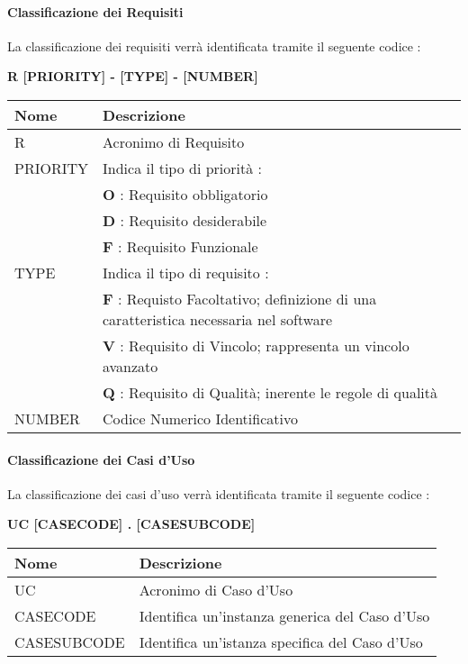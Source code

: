     \paragraph{Classificazione dei Requisiti} \hfill \break
    La classificazione dei requisiti verrà identificata tramite il seguente codice : 
    \begin{center}
      \textbf{R [PRIORITY] - [TYPE] - [NUMBER]}
    \end{center}

    \renewcommand{\arraystretch}{1.8} %
    \begin{tabular}{ |m{7em}|m{30em}| }
      \hline
      \textbf{Nome} & \textbf{Descrizione} \\
      \hline
      R & Acronimo di Requisito \\
      \hline
      PRIORITY & Indica il tipo di priorità : \\
            &	\textbf{O} : Requisito obbligatorio \\
            &	\textbf{D} : Requisito desiderabile \\
            &	\textbf{F} : Requisito Funzionale \\
      \hline 	 
      TYPE & Indica il tipo di requisito : \\
            & \textbf{F} : Requisto Facoltativo; definizione di una 	caratteristica necessaria nel software \\
            &	\textbf{V} : Requisito di Vincolo; rappresenta un vincolo avanzato \\
            &	\textbf{Q} : Requisito di Qualità; inerente le regole di qualità \\
      \hline
      NUMBER & Codice Numerico Identificativo \\
      \hline
    \end{tabular}
      
    \paragraph{Classificazione dei Casi d'Uso} \hfill \break
    La classificazione dei casi d'uso verrà identificata tramite il seguente codice : 
    \begin{center}
      \textbf{UC [CASECODE] . [CASESUBCODE]}
    \end{center}
      
    \begin{tabular}{ |m{10em}|m{27em}| }
      \hline
      \textbf{Nome} & \textbf{Descrizione} \\
      \hline
      UC & Acronimo di Caso d'Uso \\
      \hline
      CASECODE & Identifica un'instanza generica del Caso d'Uso  \\
      \hline
      CASESUBCODE	& Identifica un'istanza specifica del Caso d'Uso \\
      \hline
    \end{tabular}
      
